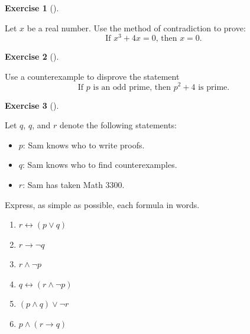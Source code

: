 \documentclass[
  letterpaper,
  10pt,
  reqno,
  twopage,
  openany]{book}
\providecommand{\tightlist}{%
  \setlength{\itemsep}{0pt}\setlength{\parskip}{0pt}}\usepackage{longtable,booktabs,array}
\theoremstyle{plain}
\theoremstyle{definition}
\newtheorem{exercise}{Exercise}[chapter]
\theoremstyle{definition}
\theoremstyle{definition}
\theoremstyle{plain}
\theoremstyle{plain}
\theoremstyle{remark}
\begin{document}
\leavevmode{}%
\begin{exercise}[]\label{exr-contradiction-to-prove}

Let \(x\) be a real number. Use the method of contradiction to prove: \[
\text{If $x^3+4x=0$, then $x=0$.} 
\]

\end{exercise}

\leavevmode{}%
\begin{exercise}[]\label{exr-counterexample-to-disprove}

Use a counterexample to disprove the statement \[
\text{If $p$ is an odd prime, then $p^2+4$ is prime.}
\]

\end{exercise}

\leavevmode{}%
\begin{exercise}[]\label{exr-simple-as-possible}

Let \(q\), \(q\), and \(r\) denote the following statements:

\begin{itemize}
\tightlist
\item
  \(p\): Sam knows who to write proofs.
\item
  \(q\): Sam knows who to find counterexamples.
\item
  \(r\): Sam has taken Math 3300.
\end{itemize}

Express, as simple as possible, each formula in words.

\begin{enumerate}
\def\labelenumi{\arabic{enumi}.}
\tightlist
\item
  \(r\leftrightarrow (p\lor q)\)
\item
  \(r\rightarrow \neg q\)
\item
  \(r\land \neg p\)
\item
  \(q\leftrightarrow (r\land \neg p)\)
\item
  \((p\land q)\lor \neg r\)
\item
  \(p\land (r\rightarrow q)\)
\end{enumerate}

\end{exercise}
\end{document}
